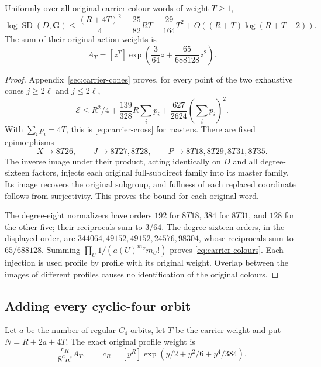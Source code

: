 \begin{theorem}\label{thm:carrier-cross}
Uniformly over all original carrier colour words of weight $T\geq1$,
\begin{equation}\label{eq:carrier-cross}
 \log\operatorname{SD}(D,\boldsymbol G)
 \leq\frac{(R+4T)^2}{4}-\frac{25}{82}RT-\frac{29}{164}T^2
           +O((R+T)\log(R+T+2)).
\end{equation}
The sum of their original action weights is
\begin{equation}\label{eq:carrier-colours}
 A_T=[z^T]\exp\left(\frac3{64}z+\frac{65}{688128}z^2\right).
\end{equation}
\end{theorem}
\begin{proof}
Appendix~\ref{sec:carrier-cones} proves, for every point of the two
exhaustive cones $j\geq2\ell$ and $j\leq2\ell$,
\[
 \mathcal E\leq R^2/4+\frac{139}{328}R\sum_i p_i
                    +\frac{627}{2624}\left(\sum_i p_i\right)^2.
\]
With $\sum_i p_i=4T$, this is \eqref{eq:carrier-cross} for masters.
There are fixed epimorphisms
\[
 X\to8T26,\qquad J\to8T27,8T28,\qquad
 P\to8T18,8T29,8T31,8T35.
\]
The inverse image under their product, acting identically on $D$ and
all degree-sixteen factors, injects each original full-subdirect
family into its master family. Its image recovers the original
subgroup, and fullness of each replaced coordinate follows from
surjectivity. This proves the bound for each original word.

The degree-eight normalizers have orders $192$ for $8T18$, $384$
for $8T31$, and $128$ for the other five; their reciprocals sum to
$3/64$. The degree-sixteen orders, in the displayed order, are
$344064,49152,49152,24576,98304$, whose reciprocals sum to
$65/688128$. Summing $\prod_U1/(a(U)^{m_U}m_U!)$ proves
\eqref{eq:carrier-colours}. Each injection is used profile by profile
with its original weight. Overlap between the images of different
profiles causes no identification of the original colours.
\end{proof}

\subsection{Adding every cyclic-four orbit}
Let $a$ be the number of regular $C_4$ orbits, let $T$ be the carrier
weight and put $N=R+2a+4T$. The exact original profile weight is
\begin{equation}\label{eq:mixture-weight}
 \frac{c_R}{8^a a!}A_T,
 \qquad c_R=[y^R]\exp(y/2+y^2/6+y^4/384).
\end{equation}

